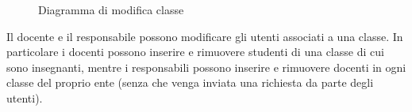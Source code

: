 \documentclass[a4paper, titlepage]{article}
\begin{document}
\newpage
{}
\begin{figure}[H]
	\centering
	\noindent{}
	\caption{Diagramma di modifica classe}
\end{figure}
Il docente e il responsabile possono modificare gli utenti associati a una classe. In particolare i docenti possono inserire e rimuovere studenti di una classe di cui sono insegnanti, mentre i responsabili possono inserire e rimuovere docenti in ogni classe del proprio ente (senza che venga inviata una richiesta da parte degli utenti). 

\newpage
\end{document}
